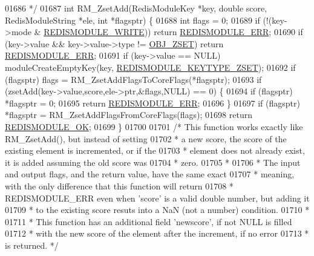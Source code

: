 \begin{DoxyCode}
{{{01686 \textcolor{comment}{ */}
01687 \textcolor{keywordtype}{int} RM\_ZsetAdd(RedisModuleKey *key, \textcolor{keywordtype}{double} score, RedisModuleString *ele, \textcolor{keywordtype}{int} *flagsptr) \{
01688     \textcolor{keywordtype}{int} flags = 0;
01689     \textcolor{keywordflow}{if} (!(key->mode & \hyperlink{redismodule_8h_a73b37117ef94cb4a904361afcc51b6b4}{REDISMODULE\_WRITE})) \textcolor{keywordflow}{return} 
      \hyperlink{redismodule_8h_a3df6f5bd5247289e66f44437a7cddd49}{REDISMODULE\_ERR};
01690     \textcolor{keywordflow}{if} (key->value && key->value->type != \hyperlink{server_8h_a8c356422ddbc03bd77694880a30a1953}{OBJ\_ZSET}) \textcolor{keywordflow}{return} 
      \hyperlink{redismodule_8h_a3df6f5bd5247289e66f44437a7cddd49}{REDISMODULE\_ERR};
01691     \textcolor{keywordflow}{if} (key->value == NULL) moduleCreateEmptyKey(key,
      \hyperlink{redismodule_8h_a93d1514d4c11cc65551b36cfd9a72cc2}{REDISMODULE\_KEYTYPE\_ZSET});
01692     \textcolor{keywordflow}{if} (flagsptr) flags = RM\_ZsetAddFlagsToCoreFlags(*flagsptr);
01693     \textcolor{keywordflow}{if} (zsetAdd(key->value,score,ele->ptr,&flags,NULL) == 0) \{
01694         \textcolor{keywordflow}{if} (flagsptr) *flagsptr = 0;
01695         \textcolor{keywordflow}{return} \hyperlink{redismodule_8h_a3df6f5bd5247289e66f44437a7cddd49}{REDISMODULE\_ERR};
01696     \}
01697     \textcolor{keywordflow}{if} (flagsptr) *flagsptr = RM\_ZsetAddFlagsFromCoreFlags(flags);
01698     \textcolor{keywordflow}{return} \hyperlink{redismodule_8h_a1bc5bfd69abcd378ff52c640adc5418d}{REDISMODULE\_OK};
01699 \}
01700 
01701 \textcolor{comment}{/* This function works exactly like RM\_ZsetAdd(), but instead of setting}
01702 \textcolor{comment}{ * a new score, the score of the existing element is incremented, or if the}
01703 \textcolor{comment}{ * element does not already exist, it is added assuming the old score was}
01704 \textcolor{comment}{ * zero.}
01705 \textcolor{comment}{ *}
01706 \textcolor{comment}{ * The input and output flags, and the return value, have the same exact}
01707 \textcolor{comment}{ * meaning, with the only difference that this function will return}
01708 \textcolor{comment}{ * REDISMODULE\_ERR even when 'score' is a valid double number, but adding it}
01709 \textcolor{comment}{ * to the existing score resuts into a NaN (not a number) condition.}
01710 \textcolor{comment}{ *}
01711 \textcolor{comment}{ * This function has an additional field 'newscore', if not NULL is filled}
01712 \textcolor{comment}{ * with the new score of the element after the increment, if no error}
01713 \textcolor{comment}{ * is returned. */}
}}}
\end{DoxyCode}
